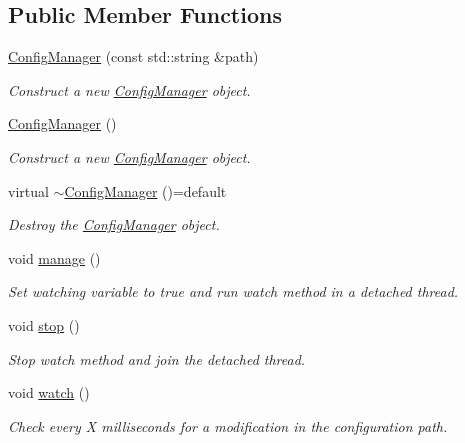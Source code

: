 \subsection*{Public Member Functions}
\begin{DoxyCompactItemize}
\item 
\hyperlink{classcfg_1_1_config_manager_a5434bffe1b9b3a20026e2526601911f2}{Config\+Manager} (const std\+::string \&path)
\begin{DoxyCompactList}\small\item\em Construct a new \hyperlink{classcfg_1_1_config_manager}{Config\+Manager} object. \end{DoxyCompactList}\item 
\hyperlink{classcfg_1_1_config_manager_a7d3d7c10423d969f7544509f6fcca32f}{Config\+Manager} ()
\begin{DoxyCompactList}\small\item\em Construct a new \hyperlink{classcfg_1_1_config_manager}{Config\+Manager} object. \end{DoxyCompactList}\item 
virtual \hyperlink{classcfg_1_1_config_manager_a0b0ce1e9ef223cd18360eaaeecc7e1ab}{$\sim$\+Config\+Manager} ()=default
\begin{DoxyCompactList}\small\item\em Destroy the \hyperlink{classcfg_1_1_config_manager}{Config\+Manager} object. \end{DoxyCompactList}\item 
void \hyperlink{classcfg_1_1_config_manager_addf0e3547d8e4d7dd023c17e43e8176d}{manage} ()
\begin{DoxyCompactList}\small\item\em Set watching variable to true and run watch method in a detached thread. \end{DoxyCompactList}\item 
void \hyperlink{classcfg_1_1_config_manager_ae72f47047d91fa0418391aa99b2383ef}{stop} ()
\begin{DoxyCompactList}\small\item\em Stop watch method and join the detached thread. \end{DoxyCompactList}\item 
void \hyperlink{classcfg_1_1_config_manager_a31f95938b66f996b8e731dada6b4a880}{watch} ()
\begin{DoxyCompactList}\small\item\em Check every X milliseconds for a modification in the configuration path. \end{DoxyCompactList}\item 

\end{DoxyCompactItemize}

